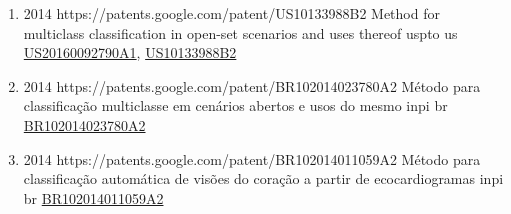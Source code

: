 \begin{enumerate}[resume]
\item{}
  {
  }
  {2014}
  {https://patents.google.com/patent/US10133988B2}
  {Method for multiclass classification in open-set scenarios and uses thereof}
  {uspto}
  {us}
  {\href{https://patents.google.com/patent/US20160092790A1}{US20160092790A1}, \href{https://patents.google.com/patent/US10133988B2}{US10133988B2}}
  {}
  {}
  {}
\item{}
  {
  }
  {2014}
  {https://patents.google.com/patent/BR102014023780A2}%
  {Método para classificação multiclasse em cenários abertos e usos do mesmo}
  {inpi}
  {br}
  {\href{https://patents.google.com/patent/BR102014023780A2}{BR102014023780A2}}
  {}
  {}
  {}
\item{}
  {
  }
  {2014}
  {https://patents.google.com/patent/BR102014011059A2}
  {Método para classificação automática de visões do coração a partir de ecocardiogramas}
  {inpi}
  {br}
  {\href{https://patents.google.com/patent/BR102014011059A2}{BR102014011059A2}}
  {}
  {}
  {}
\end{enumerate}






